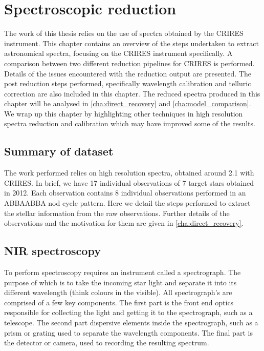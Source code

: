 
\chapter{Spectroscopic reduction} %
\label{cha:reduction}

The work of this thesis relies on the use of \nir{} spectra obtained by the {CRIRES} instrument.
This chapter contains an overview of the steps undertaken to extract astronomical spectra, focusing on the {CRIRES} instrument specifically.
A comparison between two different reduction pipelines for {CRIRES} is performed.
Details of the issues encountered with the reduction output are presented.
The post reduction steps performed, specifically wavelength calibration and telluric correction are also included in this chapter.
The reduced spectra produced in this chapter will be analysed in \cref{cha:direct_recovery} and \cref{cha:model_comparison}.
We wrap up this chapter by highlighting other techniques in high resolution \nir{} spectra reduction and calibration which may have improved some of the results.

\section{Summary of dataset}
\todo{}{}
The work performed relies on high resolution \nir{} spectra, obtained around 2.1\um{} with {CRIRES}.
In brief, we have 17 individual observations of 7 target stars obtained in 2012.
Each observation contains 8 individual observations performed in an {ABBAABBA} nod cycle pattern.
Here we detail the steps performed to extract the stellar information from the raw observations.
Further details of the observations and the motivation for them are given in \cref{cha:direct_recovery}.


\section{NIR spectroscopy}
To perform spectroscopy requires an instrument called a spectrograph. The purpose of which is to take the incoming star light and separate it into its different wavelength (think colours in the visible).
All spectrograph's are comprised of a few key components.
The first part is the front end optics responsible for collecting the light and getting it to the spectrograph, such as a telescope.
The second part dispersive elements inside the spectrograph, such as a prism or grating used to separate the wavelength components.
The final part is the detector or camera, used to recording the resulting spectrum.

